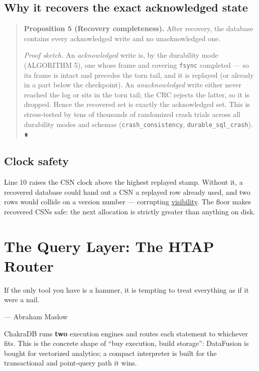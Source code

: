 \documentclass[
  11pt,
  openany]{book}
\begin{document}
\section{Why it recovers the exact acknowledged
state}\label{why-it-recovers-the-exact-acknowledged-state}

\begin{quote}
\textbf{Proposition 5 (Recovery completeness).} After recovery, the
database contains every acknowledged write and no unacknowledged one.

\emph{Proof sketch.} An \emph{acknowledged} write is, by the durability
mode (ALGORITHM 5), one whose frame and covering \texttt{fsync}
completed --- so its frame is intact and precedes the torn tail, and it
is replayed (or already in a part below the checkpoint). An
\emph{unacknowledged} write either never reached the log or sits in the
torn tail; the CRC rejects the latter, so it is dropped. Hence the
recovered set is exactly the acknowledged set. This is stress-tested by
tens of thousands of randomized crash trials across all durability modes
and schemas (\texttt{crash\_consistency}, \texttt{durable\_sql\_crash}).
∎
\end{quote}

\section{Clock safety}\label{clock-safety}

Line 10 raises the CSN clock above the highest replayed stamp. Without
it, a recovered database could hand out a CSN a replayed row already
used, and two rows would collide on a version number --- corrupting
\href{mvcc.md}{visibility}. The floor makes recovered CSNs safe: the
next allocation is strictly greater than anything on disk.

\chapter{The Query Layer: The HTAP
Router}\label{the-query-layer-the-htap-router}

\epigraph{If the only tool you have is a hammer, it is tempting to treat everything as if it were a nail.}{--- Abraham Maslow}

ChakraDB runs \textbf{two} execution engines and routes each statement
to whichever fits. This is the concrete shape of ``buy execution, build
storage'': DataFusion is bought for vectorized analytics; a compact
interpreter is built for the transactional and point-query path it wins.
\end{document}
